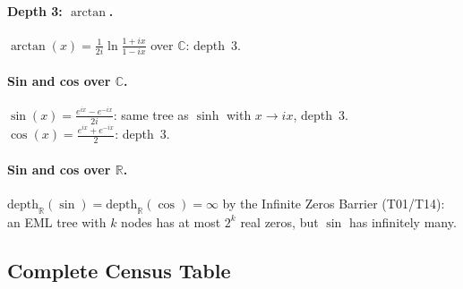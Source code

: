 \documentclass[12pt,a4paper]{article}
\theoremstyle{definition}
\theoremstyle{remark}
\begin{document}
\paragraph{Depth 3: $\arctan$.}
$\arctan(x) = \frac{1}{2i}\ln\frac{1+ix}{1-ix}$ over $\mathbb{C}$: depth~3.

\paragraph{Sin and cos over $\mathbb{C}$.}
$\sin(x) = \frac{e^{ix}-e^{-ix}}{2i}$: same tree as $\sinh$ with $x \to ix$, depth~3.
$\cos(x) = \frac{e^{ix}+e^{-ix}}{2}$: depth~3.

\paragraph{Sin and cos over $\mathbb{R}$.}
$\mathrm{depth}_\mathbb{R}(\sin) = \mathrm{depth}_\mathbb{R}(\cos) = \infty$
by the Infinite Zeros Barrier (T01/T14): an EML tree with $k$ nodes has at most $2^k$ real zeros,
but $\sin$ has infinitely many.

\subsection{Complete Census Table}
\end{document}
